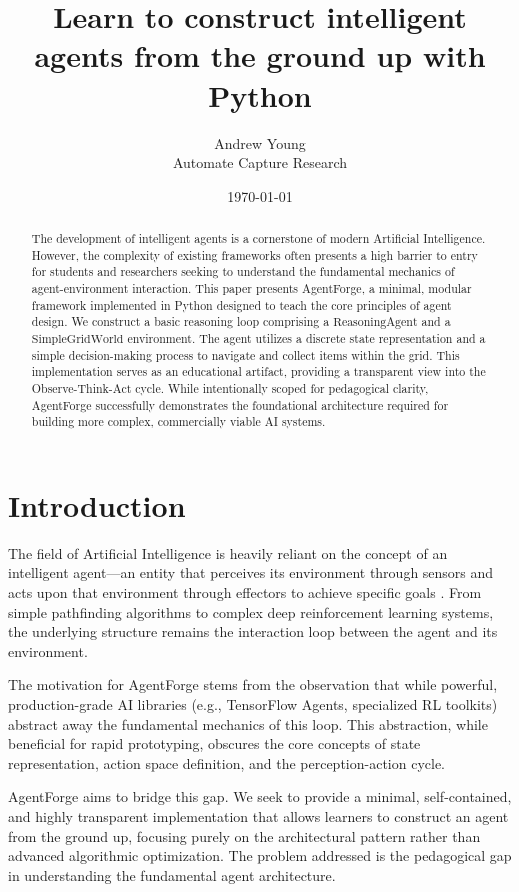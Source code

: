 \documentclass[11pt,a4paper]{article}
\title{Learn to construct intelligent agents from the ground up with Python}
\author{Andrew Young \\ Automate Capture Research}
\date{\today}
\begin{document}
\maketitle

\begin{abstract}
The development of intelligent agents is a cornerstone of modern Artificial Intelligence. However, the complexity of existing frameworks often presents a high barrier to entry for students and researchers seeking to understand the fundamental mechanics of agent-environment interaction. This paper presents AgentForge, a minimal, modular framework implemented in Python designed to teach the core principles of agent design. We construct a basic reasoning loop comprising a $\text{ReasoningAgent}$ and a $\text{SimpleGridWorld}$ environment. The agent utilizes a discrete state representation and a simple decision-making process to navigate and collect items within the grid. This implementation serves as an educational artifact, providing a transparent view into the Observe-Think-Act cycle. While intentionally scoped for pedagogical clarity, AgentForge successfully demonstrates the foundational architecture required for building more complex, commercially viable AI systems.
\end{abstract}

\section{Introduction}
The field of Artificial Intelligence is heavily reliant on the concept of an intelligent agent—an entity that perceives its environment through sensors and acts upon that environment through effectors to achieve specific goals \cite{agent_definition}. From simple pathfinding algorithms to complex deep reinforcement learning systems, the underlying structure remains the interaction loop between the agent and its environment.

The motivation for AgentForge stems from the observation that while powerful, production-grade AI libraries (e.g., TensorFlow Agents, specialized RL toolkits) abstract away the fundamental mechanics of this loop. This abstraction, while beneficial for rapid prototyping, obscures the core concepts of state representation, action space definition, and the perception-action cycle.

AgentForge aims to bridge this gap. We seek to provide a minimal, self-contained, and highly transparent implementation that allows learners to construct an agent from the ground up, focusing purely on the architectural pattern rather than advanced algorithmic optimization. The problem addressed is the pedagogical gap in understanding the fundamental agent architecture.
\end{document}
